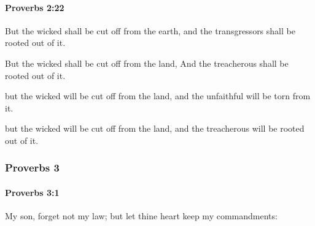 		\paragraph{Proverbs 2:22} %
			\label{PROVERBS-2-22}

			But the wicked shall be cut off from the earth, and the transgressors shall be rooted out of it.

			\begin{versebox}
					\item[BHS] 
					\item[ASV] But the wicked shall be cut off from the land, And the treacherous shall be rooted out of it.
					\item[NIV] but the wicked will be cut off from the land, and the unfaithful will be torn from it.
					\item[NRSV] but the wicked will be cut off from the land, and the treacherous will be rooted out of it.
			\end{versebox}
	\subsubsection{Proverbs 3} %
		\label{PROVERBS-3}

		\paragraph{Proverbs 3:1} %
			\label{PROVERBS-3-1}

			My son, forget not my law; but let thine heart keep my commandments:

